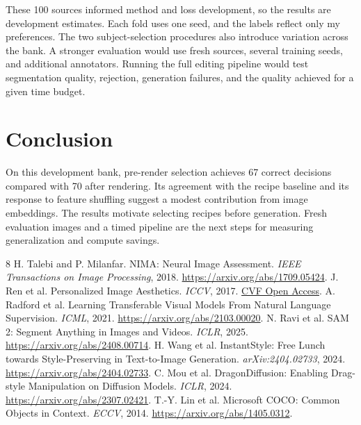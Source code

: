 \documentclass{article}
\begin{document}
These 100 sources informed method and loss development, so the results are development estimates. Each fold uses one seed, and the labels reflect only my preferences. The two subject-selection procedures also introduce variation across the bank. A stronger evaluation would use fresh sources, several training seeds, and additional annotators. Running the full editing pipeline would test segmentation quality, rejection, generation failures, and the quality achieved for a given time budget.

\section{Conclusion}
On this development bank, pre-render selection achieves 67 correct decisions compared with 70 after rendering. Its agreement with the recipe baseline and its response to feature shuffling suggest a modest contribution from image embeddings. The results motivate selecting recipes before generation. Fresh evaluation images and a timed pipeline are the next steps for measuring generalization and compute savings.

\begin{thebibliography}{8}
 H. Talebi and P. Milanfar. NIMA: Neural Image Assessment. \emph{IEEE Transactions on Image Processing}, 2018. \url{https://arxiv.org/abs/1709.05424}.
 J. Ren et al. Personalized Image Aesthetics. \emph{ICCV}, 2017. \href{https://openaccess.thecvf.com/content_iccv_2017/html/Ren_Personalized_Image_Aesthetics_ICCV_2017_paper.html}{CVF Open Access}.
 A. Radford et al. Learning Transferable Visual Models From Natural Language Supervision. \emph{ICML}, 2021. \url{https://arxiv.org/abs/2103.00020}.
 N. Ravi et al. SAM 2: Segment Anything in Images and Videos. \emph{ICLR}, 2025. \url{https://arxiv.org/abs/2408.00714}.
 H. Wang et al. InstantStyle: Free Lunch towards Style-Preserving in Text-to-Image Generation. \emph{arXiv:2404.02733}, 2024. \url{https://arxiv.org/abs/2404.02733}.
 C. Mou et al. DragonDiffusion: Enabling Drag-style Manipulation on Diffusion Models. \emph{ICLR}, 2024. \url{https://arxiv.org/abs/2307.02421}.
 T.-Y. Lin et al. Microsoft COCO: Common Objects in Context. \emph{ECCV}, 2014. \url{https://arxiv.org/abs/1405.0312}.
\end{thebibliography}
\end{document}
